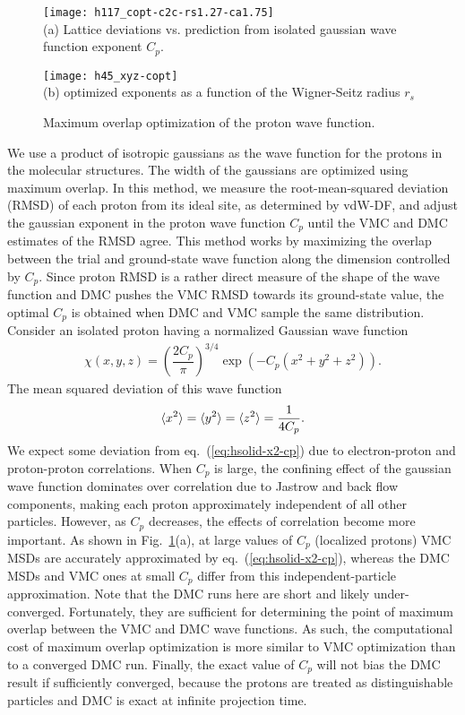 \begin{figure}[h]
\centering
\begin{minipage}{0.49\textwidth}
\centering
\texttt{[image: h117\_copt-c2c-rs1.27-ca1.75]}\\
(a) Lattice deviations vs. prediction from isolated gaussian wave function exponent $C_p$.
\end{minipage}
\begin{minipage}{0.49\textwidth}
\centering
\texttt{[image: h45\_xyz-copt]}\\
(b) optimized exponents as a function of the Wigner-Seitz radius $r_s$
\end{minipage}
\caption{Maximum overlap optimization of the proton wave function.}
\label{fig:prot-cp-opt}
\end{figure}

We use a product of isotropic gaussians as the wave function for the protons in the molecular structures.
The width of the gaussians are optimized using maximum overlap.
In this method, we measure the root-mean-squared deviation (RMSD) of each proton from its ideal site, as determined by vdW-DF, and adjust the gaussian exponent in the proton wave function $C_p$ until the VMC and DMC estimates of the RMSD agree.
This method works by maximizing the overlap between the trial and ground-state wave function along the dimension controlled by $C_p$.
Since proton RMSD is a rather direct measure of the shape of the wave function and DMC pushes the VMC RMSD towards its ground-state value, the optimal $C_p$ is obtained when DMC and VMC sample the same distribution.
Consider an isolated proton having a normalized Gaussian wave function
\begin{align}
\chi(x, y, z) = \left(\dfrac{2C_p}{\pi}\right)^{3/4} \exp\left(
-C_p(x^2+y^2+z^2)
\right).
\end{align}
The mean squared deviation of this wave function
\begin{align} \label{eq:hsolid-x2-cp}
\braket{x^2}=\braket{y^2}=\braket{z^2}=\dfrac{1}{4C_p}.
\end{align}
We expect some deviation from eq.~(\ref{eq:hsolid-x2-cp}) due to electron-proton and proton-proton correlations. When $C_p$ is large, the confining effect of the gaussian wave function dominates over correlation due to Jastrow and back flow components, making each proton approximately independent of all other particles. However, as $C_p$ decreases, the effects of correlation become more important. As shown in Fig.~\ref{fig:prot-cp-opt}(a), at large values of $C_p$ (localized protons) VMC MSDs are accurately approximated by eq.~(\ref{eq:hsolid-x2-cp}), whereas the DMC MSDs and VMC ones at small $C_p$ differ from this independent-particle approximation.
Note that the DMC runs here are short and likely under-converged.
Fortunately, they are sufficient for determining the point of maximum overlap between the VMC and DMC wave functions.
As such, the computational cost of maximum overlap optimization is more similar to VMC optimization than to a converged DMC run.
Finally, the exact value of $C_p$ will not bias the DMC result if sufficiently converged, because the protons are treated as distinguishable particles and DMC is exact at infinite projection time.

